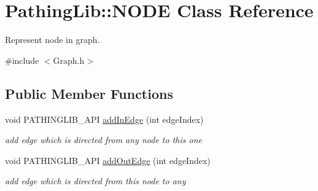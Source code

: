 \hypertarget{class_pathing_lib_1_1_n_o_d_e}{}\section{Pathing\+Lib\+:\+:N\+O\+DE Class Reference}
\label{class_pathing_lib_1_1_n_o_d_e}


Represent node in graph.  




{\ttfamily \#include $<$Graph.\+h$>$}

\subsection*{Public Member Functions}
\begin{DoxyCompactItemize}
\item 
void P\+A\+T\+H\+I\+N\+G\+L\+I\+B\+\_\+\+A\+PI \hyperlink{class_pathing_lib_1_1_n_o_d_e_a231ff19a857563fc5c9251e4c0a0b609}{add\+In\+Edge} (int edge\+Index)\hypertarget{class_pathing_lib_1_1_n_o_d_e_a231ff19a857563fc5c9251e4c0a0b609}{}\label{class_pathing_lib_1_1_n_o_d_e_a231ff19a857563fc5c9251e4c0a0b609}

\begin{DoxyCompactList}\small\item\em add edge which is directed from any node to this one \end{DoxyCompactList}\item 
void P\+A\+T\+H\+I\+N\+G\+L\+I\+B\+\_\+\+A\+PI \hyperlink{class_pathing_lib_1_1_n_o_d_e_a10541e73483e017a8fca31a7c618c219}{add\+Out\+Edge} (int edge\+Index)\hypertarget{class_pathing_lib_1_1_n_o_d_e_a10541e73483e017a8fca31a7c618c219}{}\label{class_pathing_lib_1_1_n_o_d_e_a10541e73483e017a8fca31a7c618c219}

\begin{DoxyCompactList}\small\item\em add edge which is directed from this node to any \end{DoxyCompactList}\end{DoxyCompactItemize}
